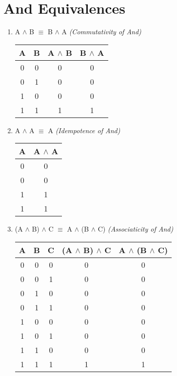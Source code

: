 \documentclass{report}
\begin{document}
\section{And Equivalences}
\begin{enumerate}

  \item A $\land$ B $\equiv$ B $\land$ A \emph{(Commutativity of And)}

\begin{center}
  \begin{tabular}{| c | c | c | c |}
    \hline
    A & B & A $\land$ B & B $\land$ A \\ \hline
    0 & 0 & 0 & 0 \\
    0 & 1 & 0 & 0 \\
    1 & 0 & 0 & 0 \\
    1 & 1 & 1 & 1 \\ \hline
  \end{tabular}
\end{center}

  \item A $\land$ A $\equiv$ A \emph{(Idempotence of And)}

\begin{center}
  \begin{tabular}{| c | c |}
    \hline
    A & A $\land$ A \\ \hline
    0 & 0 \\
    0 & 0 \\
    1 & 1 \\
    1 & 1 \\ \hline
  \end{tabular}
\end{center}

  \item (A $\land$ B) $\land$ C $\equiv$ A $\land$ (B $\land$ C) \emph{(Associaticity of And)}

\begin{center}
  \begin{tabular}{| c | c | c | c | c |}
    \hline
    A & B & C & (A $\land$ B) $\land$ C & A $\land$ (B $\land$ C) \\ \hline
    0 & 0 & 0 & 0 & 0 \\
    0 & 0 & 1 & 0 & 0 \\
    0 & 1 & 0 & 0 & 0 \\
    0 & 1 & 1 & 0 & 0 \\
    1 & 0 & 0 & 0 & 0 \\
    1 & 0 & 1 & 0 & 0 \\
    1 & 1 & 0 & 0 & 0 \\
    1 & 1 & 1 & 1 & 1 \\ \hline
  \end{tabular}
\end{center}
\end{enumerate}
\end{document}

